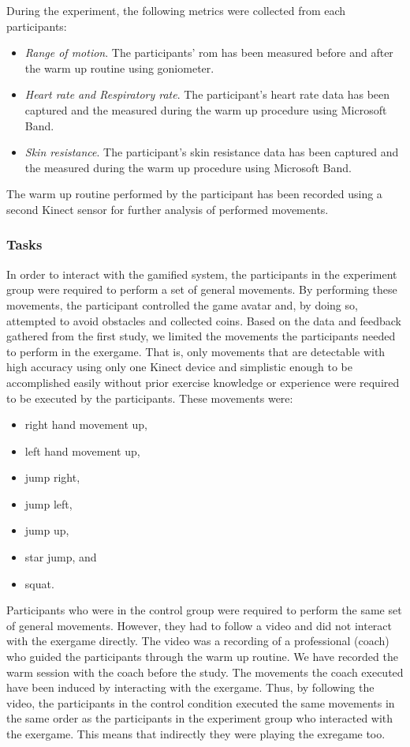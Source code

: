 During the experiment, the following metrics were collected from each participants:
\begin{itemize}
\item \textit{Range of motion}. The participants' \acrshort{rom} has been measured before and after the warm up routine using goniometer.
\item \textit{Heart rate and Respiratory rate}. The participant's heart rate data has been captured and the measured during the warm up procedure using Microsoft Band.
\item \textit{Skin resistance}. The participant's skin resistance data has been captured and the measured during the warm up procedure using Microsoft Band.
\end{itemize}
The warm up routine performed by the participant has been recorded using a second Kinect sensor for further analysis of performed movements.\pagebreak
\subsubsection{Tasks}
In order to interact with the gamified system, the participants in the experiment group were required to perform a set of general movements. By performing these movements, the participant controlled the game avatar and, by doing so, attempted to avoid obstacles and collected coins. Based on the data and feedback gathered from the first study, we limited the movements the participants needed to perform in the exergame. That is, only movements that are detectable with high accuracy using only one Kinect device and simplistic enough to be accomplished easily without prior exercise knowledge or experience were required to be executed by the participants. These movements were: 
\begin{itemize}
\item right hand movement up,
\item left hand movement up,
\item jump right,
\item jump left,
\item jump up, 
\item star jump, and
\item squat.
\end{itemize}
Participants who were in the control group were required to perform the same set of general movements. However, they had to follow a video and did not interact with the exergame directly. The video was a recording of a professional (coach) who guided the participants through the warm up routine. We have recorded the warm session with the coach before the study. The movements the coach executed have been induced by interacting with the exergame. Thus, by following the video, the participants in the control condition executed the same movements in the same order as the participants in the experiment group who interacted with the exergame. This means that indirectly they were playing the exregame too.
